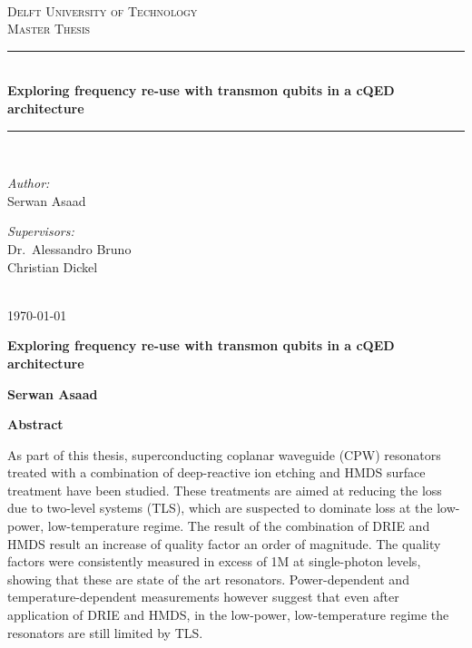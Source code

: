 \documentclass[12pt]{report}
\newcommand\blankpage{%
    \null
    \thispagestyle{empty}%
    \addtocounter{page}{-1}%
    \newpage}
\newcommand{\HRule}[1]{\rule{\linewidth}{#1}}
\begin{document}
\begin{titlepage}
\begin{center}
~\\ [4.0 cm]
\textsc{\LARGE Delft University of Technology}
\\ [3.0 cm]
\textsc{\Large Master Thesis}
\HRule{0.5 pt} \\
\LARGE \textbf{Exploring frequency re-use with transmon qubits in a cQED architecture}
\HRule{2 pt} \\ [0.5 cm]

\noindent
\begin{minipage}{0.4\textwidth}
\begin{flushleft} \large
\emph{Author:}\\
Serwan Asaad
\end{flushleft}
\end{minipage}%
\begin{minipage}{0.4\textwidth}
\begin{flushright} \large
\emph{Supervisors:} \\
Dr.~Alessandro Bruno \\
Christian Dickel
\end{flushright}
\end{minipage}
\\ [3.0 cm]
{\large \today}
\end{center}

\end{titlepage}


\author{
    Serwan Asaad
    Student ID: 4323475 \\
    Delft University of Technology \\
    Kavli Institute of Nanoscience\\
    Quantum Nanoscience Department\\
    Quantum Transport Group\\
    DiCarlo Lab}

\blankpage
\thispagestyle{plain}
\begin{center}
    \Large
    \textbf{Exploring frequency re-use with transmon qubits in a cQED architecture}


    \vspace{0.4cm}
    \textbf{Serwan Asaad}

    \vspace{0.9cm}
    \textbf{Abstract}
\end{center}
As part of this thesis, superconducting coplanar waveguide (CPW) resonators treated with a combination of deep-reactive ion etching and HMDS surface treatment have been studied. These treatments are aimed at reducing the loss due to two-level systems (TLS), which are suspected to dominate loss at the low-power, low-temperature regime. The result of the combination of DRIE and HMDS result an increase of quality factor an order of magnitude. The quality factors were consistently measured in excess of 1M at single-photon levels, showing that these are state of the art resonators. Power-dependent and temperature-dependent measurements however suggest that even after application of DRIE and HMDS, in the low-power, low-temperature regime the resonators are still limited by TLS.
\end{document}
